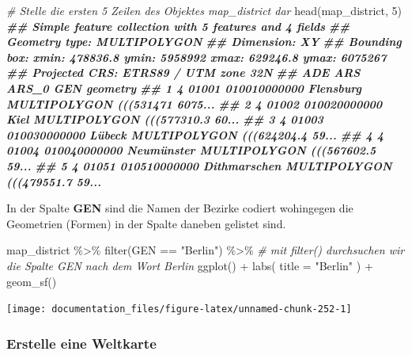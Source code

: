 \documentclass[
]{article}
\newenvironment{Shaded}{\begin{snugshade}}{\end{snugshade}}
\newcommand{\AttributeTok}[1]{\textcolor[rgb]{0.77,0.63,0.00}{#1}}
\newcommand{\CommentTok}[1]{\textcolor[rgb]{0.56,0.35,0.01}{\textit{#1}}}
\newcommand{\DecValTok}[1]{\textcolor[rgb]{0.00,0.00,0.81}{#1}}
\newcommand{\DocumentationTok}[1]{\textcolor[rgb]{0.56,0.35,0.01}{\textbf{\textit{#1}}}}
\newcommand{\FunctionTok}[1]{\textcolor[rgb]{0.00,0.00,0.00}{#1}}
\newcommand{\NormalTok}[1]{#1}
\newcommand{\SpecialCharTok}[1]{\textcolor[rgb]{0.00,0.00,0.00}{#1}}
\newcommand{\StringTok}[1]{\textcolor[rgb]{0.31,0.60,0.02}{#1}}
\begin{document}
\begin{Shaded}
\begin{Highlighting}[]

\CommentTok{\# Stelle die ersten 5 Zeilen des Objektes map\_district dar}
\FunctionTok{head}\NormalTok{(map\_district, }\DecValTok{5}\NormalTok{)}
\DocumentationTok{\#\# Simple feature collection with 5 features and 4 fields}
\DocumentationTok{\#\# Geometry type: MULTIPOLYGON}
\DocumentationTok{\#\# Dimension:     XY}
\DocumentationTok{\#\# Bounding box:  xmin: 478836.8 ymin: 5958992 xmax: 629246.8 ymax: 6075267}
\DocumentationTok{\#\# Projected CRS: ETRS89 / UTM zone 32N}
\DocumentationTok{\#\#   ADE   ARS        ARS\_0          GEN                       geometry}
\DocumentationTok{\#\# 1   4 01001 010010000000    Flensburg MULTIPOLYGON (((531471 6075...}
\DocumentationTok{\#\# 2   4 01002 010020000000         Kiel MULTIPOLYGON (((577310.3 60...}
\DocumentationTok{\#\# 3   4 01003 010030000000       Lübeck MULTIPOLYGON (((624204.4 59...}
\DocumentationTok{\#\# 4   4 01004 010040000000   Neumünster MULTIPOLYGON (((567602.5 59...}
\DocumentationTok{\#\# 5   4 01051 010510000000 Dithmarschen MULTIPOLYGON (((479551.7 59...}
\end{Highlighting}
\end{Shaded}

In der Spalte \textbf{GEN} sind die Namen der Bezirke codiert wohingegen die Geometrien (Formen) in der Spalte daneben gelistet sind.

\begin{Shaded}
\begin{Highlighting}[]

\NormalTok{map\_district }\SpecialCharTok{\%\textgreater{}\%}
  \FunctionTok{filter}\NormalTok{(GEN }\SpecialCharTok{==} \StringTok{"Berlin"}\NormalTok{) }\SpecialCharTok{\%\textgreater{}\%} \CommentTok{\# mit filter() durchsuchen wir die Spalte GEN nach dem Wort Berlin}
  \FunctionTok{ggplot}\NormalTok{() }\SpecialCharTok{+}
  \FunctionTok{labs}\NormalTok{(}
    \AttributeTok{title =} \StringTok{"Berlin"}
\NormalTok{  ) }\SpecialCharTok{+}
  \FunctionTok{geom\_sf}\NormalTok{()}
\end{Highlighting}
\end{Shaded}

\begin{center}\texttt{[image: documentation\_files/figure-latex/unnamed-chunk-252-1]} \end{center}

\hypertarget{erstelle-eine-weltkarte}{%
\subsubsection{Erstelle eine Weltkarte}\label{erstelle-eine-weltkarte}}
\end{document}
